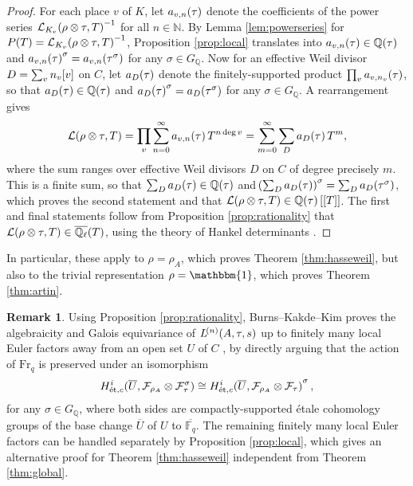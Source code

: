 \documentclass{article}
\theoremstyle{definition}
\theoremstyle{definition}
\newtheorem{remark}[n]{Remark}
\newcommand{\et}{\text{\'et}}
\newcommand{\FF}{\mathbb{F}}
\newcommand{\FFF}{\mathcal{F}}
\newcommand{\Fr}{\mathrm{Fr}}
\newcommand{\LLL}{\mathcal{L}}
\newcommand{\NN}{\mathbb{N}}
\newcommand{\QQ}{\mathbb{Q}}
\newcommand{\br}{\!\del[0]}
\begin{document}
\begin{proof}
For each place $ v $ of $ K $, let $ a_{v, n}\br{\tau} $ denote the coefficients of the power series $ \LLL_{K_v}\br{\rho \otimes \tau, T}^{-1} $ for all $ n \in \NN $. By Lemma \ref{lem:powerseries} for $ P\br{T} = \LLL_{K_v}\br{\rho \otimes \tau, T}^{-1} $, Proposition \ref{prop:local} translates into $ a_{v, n}\br{\tau} \in \QQ\br{\tau} $ and $ a_{v, n}\br{\tau}^\sigma = a_{v, n}\br{\tau^\sigma} $ for any $ \sigma \in G_\QQ $. Now for an effective Weil divisor $ D = \sum_v n_v\sbr{v} $ on $ C $, let $ a_D\br{\tau} $ denote the finitely-supported product $ \prod_v a_{v, n_v}\br{\tau} $, so that $ a_D\br{\tau} \in \QQ\br{\tau} $ and $ a_D\br{\tau}^\sigma = a_D\br{\tau^\sigma} $ for any $ \sigma \in G_\QQ $. A rearrangement gives
$$ \LLL\br{\rho \otimes \tau, T} = \prod_v \sum_{n = 0}^\infty a_{v, n}\br{\tau}T^{n\deg v} = \sum_{m = 0}^\infty \sum_D a_D\br{\tau}T^m, $$
where the sum ranges over effective Weil divisors $ D $ on $ C $ of degree precisely $ m $. This is a finite sum, so that $ \sum_D a_D\br{\tau} \in \QQ\br{\tau} $ and $ \br{\sum_D a_D\br{\tau}}^\sigma = \sum_D a_D\br{\tau^\sigma} $, which proves the second statement and that $ \LLL\br{\rho \otimes \tau, T} \in \QQ\br{\tau}[[T]] $. The first and final statements follow from Proposition \ref{prop:rationality} that $ \LLL\br{\rho \otimes \tau, T} \in \overline{\QQ_\ell}\br{T} $, using the theory of Hankel determinants \cite[Chapter IV.4, Exercise 1]{Bou03}.
\end{proof}

\pagebreak

In particular, these apply to $ \rho = \rho_A $, which proves Theorem \ref{thm:hasseweil}, but also to the trivial representation $ \rho = \mathbbm{1} $, which proves Theorem \ref{thm:artin}.

\begin{remark}
Using Proposition \ref{prop:rationality}, Burns--Kakde--Kim proves the algebraicity and Galois equivariance of $ L^{\br{n}}\br{A, \tau, s} $ up to finitely many local Euler factors away from an open set $ U $ of $ C $ \cite[Proposition 2.2]{BKK18}, by directly arguing that the action of $ \Fr_q $ is preserved under an isomorphism
$$ H_{\et, c}^i\br{\overline{U}, \FFF_{\rho_A} \otimes \FFF_\tau^\sigma} \cong H_{\et, c}^i\br{\overline{U}, \FFF_{\rho_A} \otimes \FFF_\tau}^\sigma, $$
for any $ \sigma \in G_\QQ $, where both sides are compactly-supported \'etale cohomology groups of the base change $ \overline{U} $ of $ U $ to $ \overline{\FF_q} $. The remaining finitely many local Euler factors can be handled separately by Proposition \ref{prop:local}, which gives an alternative proof for Theorem \ref{thm:hasseweil} independent from Theorem \ref{thm:global}.
\end{remark}
\end{document}
